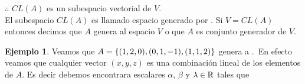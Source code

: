 \documentclass[10pt,a4paper]{amsbook}
\newtheorem{theorem}{Teorema}[chapter]
\newtheorem{lemma}[theorem]{Lema}
\theoremstyle{definition}
\newtheorem{dfn}[theorem]{Definición}
\newtheorem{ejemplo}[theorem]{Ejemplo}
\newtheorem{ejercicio}[theorem]{Ejercicio}
\theoremstyle{remark}
\numberwithin{section}{chapter}
\numberwithin{equation}{chapter}
\begin{document}
$\therefore$ $CL(A)$ es un subespacio vectorial de $V$.\\

El subespacio $CL(A)$ es llamado espacio generado por . Si $V = CL(A)$ entonces decimos que $A$ genera al espacio $V$ o que $A$ es conjunto generador de $V$.

\begin{ejemplo}
Veamos que $A =  \left\{(1,2,0),(0,1,-1),(1,1,2) \right\} $ genera a \rtres .\
En efecto veamos que cualquier vector $(x,y,z)$ es una combinación lineal de los elementos de $A$. Es decir debemos encontrara escalares $\alpha$, $\beta$ y $\lambda \in \mathbb{R}$ tales que
\end{ejemplo}
%
%
%
%
%

\end{document}
